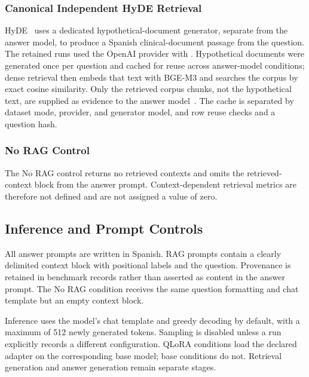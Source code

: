\subsubsection{Canonical Independent HyDE Retrieval}
HyDE~\cite{gao2023precise} uses a dedicated hypothetical-document
generator, separate from the answer model, to produce a Spanish
clinical-document passage from the question. The retained runs used the
OpenAI provider with . Hypothetical documents
were generated once per question and cached for reuse across answer-model
conditions; dense retrieval then embeds that text with BGE-M3 and searches
the corpus by exact cosine similarity. Only the retrieved corpus chunks,
not the hypothetical text, are supplied as evidence to the answer
model~\cite{ji2023survey}. The cache is separated by dataset mode, provider,
and generator model, and row reuse checks  and a question hash.

\subsubsection{No RAG Control}
The No RAG control returns no retrieved contexts and
omits the retrieved-context block from the answer prompt. Context-dependent
retrieval metrics are therefore not defined and are not assigned a value of
zero.

\subsection{Inference and Prompt Controls}
All answer prompts are written in Spanish. RAG prompts contain a clearly
delimited context block with positional labels and the question. Provenance
is retained in benchmark records rather than asserted as content in the
answer prompt. The No RAG condition receives the same question
formatting and chat template but an empty context block.

Inference uses the model's chat template and greedy decoding by default,
with a maximum of 512 newly generated tokens. Sampling is disabled unless a
run explicitly records a different configuration. QLoRA conditions load the
declared adapter on the corresponding base model; base conditions do not.
Retrieval generation and answer generation remain separate stages.

